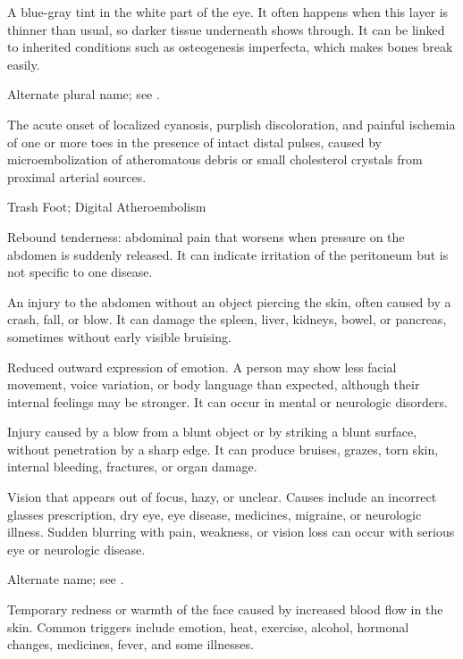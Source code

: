  A blue-gray tint in the white part of the eye. It often happens when this layer is thinner than usual, so darker tissue underneath shows through. It can be linked to inherited conditions such as osteogenesis imperfecta, which makes bones break easily.

 Alternate plural name; see .

 The acute onset of localized cyanosis, purplish discoloration, and painful ischemia of one or more toes in the presence of intact distal pulses, caused by microembolization of atheromatous debris or small cholesterol crystals from proximal arterial sources.

\synonyms
Trash Foot; Digital Atheroembolism

 Rebound tenderness: abdominal pain that worsens when pressure on the abdomen is suddenly released. It can indicate irritation of the peritoneum but is not specific to one disease.

 An injury to the abdomen without an object piercing the skin, often caused by a crash, fall, or blow. It can damage the spleen, liver, kidneys, bowel, or pancreas, sometimes without early visible bruising.

 Reduced outward expression of emotion. A person may show less facial movement, voice variation, or body language than expected, although their internal feelings may be stronger. It can occur in mental or neurologic disorders.

 Injury caused by a blow from a blunt object or by striking a blunt surface, without penetration by a sharp edge. It can produce bruises, grazes, torn skin, internal bleeding, fractures, or organ damage.

 Vision that appears out of focus, hazy, or unclear. Causes include an incorrect glasses prescription, dry eye, eye disease, medicines, migraine, or neurologic illness. Sudden blurring with pain, weakness, or vision loss can occur with serious eye or neurologic disease.

 Alternate name; see .

 Temporary redness or warmth of the face caused by increased blood flow in the skin. Common triggers include emotion, heat, exercise, alcohol, hormonal changes, medicines, fever, and some illnesses.

